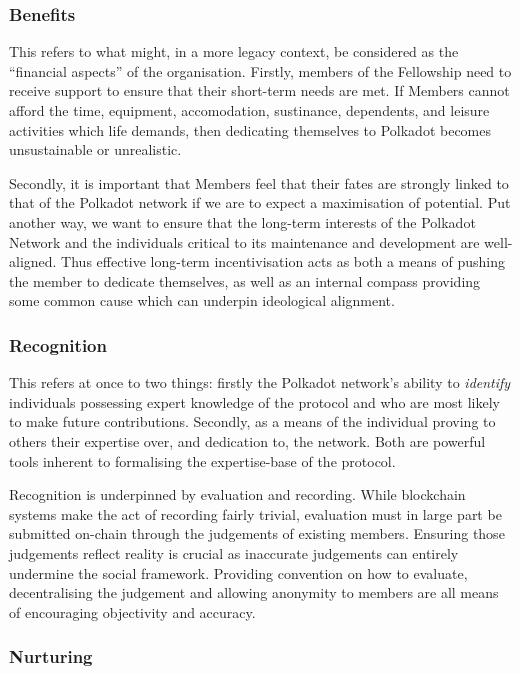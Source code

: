 \documentclass[9pt,oneside]{amsart}
\begin{document}
\subsubsection{Benefits}

This refers to what might, in a more legacy context, be considered as the ``financial aspects'' of the organisation. Firstly, members of the Fellowship need to receive support to ensure that their short-term needs are met. If Members cannot afford the time, equipment, accomodation, sustinance, dependents, and leisure activities which life demands, then dedicating themselves to Polkadot becomes unsustainable or unrealistic.

Secondly, it is important that Members feel that their fates are strongly linked to that of the Polkadot network if we are to expect a maximisation of potential. Put another way, we want to ensure that the long-term interests of the Polkadot Network and the individuals critical to its maintenance and development are well-aligned. Thus effective long-term incentivisation acts as both a means of pushing the member to dedicate themselves, as well as an internal compass providing some common cause which can underpin ideological alignment.

\subsubsection{Recognition}

This refers at once to two things: firstly the Polkadot network's ability to \emph{identify} individuals possessing expert knowledge of the protocol and who are most likely to make future contributions. Secondly, as a means of the individual proving to others their expertise over, and dedication to, the network. Both are powerful tools inherent to formalising the expertise-base of the protocol.

Recognition is underpinned by evaluation and recording. While blockchain systems make the act of recording fairly trivial, evaluation must in large part be submitted on-chain through the judgements of existing members. Ensuring those judgements reflect reality is crucial as inaccurate judgements can entirely undermine the social framework. Providing convention on how to evaluate, decentralising the judgement and allowing anonymity to members are all means of encouraging objectivity and accuracy.

\subsubsection{Nurturing}
\end{document}
